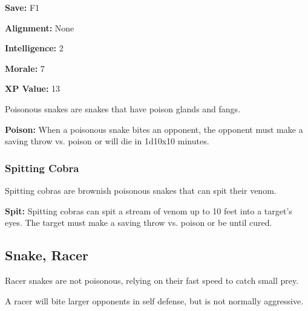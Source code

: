 \begin{multicols*}{2}
{{\textbf{Save:} F1

\textbf{Alignment:} None

\textbf{Intelligence:} 2

\textbf{Morale:} 7

\textbf{XP Value:} 13}}

Poisonous snakes are snakes that have poison glands and fangs.

\textbf{Poison:} When a poisonous snake bites an opponent, the opponent must make a saving throw vs. poison or will die in 1d10x10 minutes.

\subsubsection{Spitting Cobra}
Spitting cobras are brownish poisonous snakes that can spit their venom.

\textbf{Spit:} Spitting cobras can spit a stream of venom up to 10 feet into a target’s eyes. The target must make a saving throw vs. poison or be  until cured.

\subsection{Snake, Racer}

Racer snakes are not poisonous, relying on their fast speed to catch small prey.

A racer will bite larger opponents in self defense, but is not normally aggressive.


\end{multicols*}
